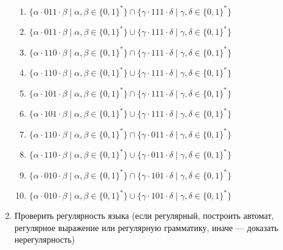 \documentclass[12pt]{article}
\begin{document}
\begin{enumerate}
\begin{enumerate}[label=\arabic*)]
    \item $\{ \alpha \cdot 011 \cdot \beta \mid \alpha, \beta \in \{0, 1\}^*\} \cap \{\gamma \cdot 111 \cdot \delta \mid \gamma, \delta \in \{0, 1\}^* \}$
    \item $\{ \alpha \cdot 011 \cdot \beta \mid \alpha, \beta \in \{0, 1\}^*\} \cup \{\gamma \cdot 111 \cdot \delta \mid \gamma, \delta \in \{0, 1\}^* \}$
    \item $\{ \alpha \cdot 110 \cdot \beta \mid \alpha, \beta \in \{0, 1\}^*\} \cap \{\gamma \cdot 111 \cdot \delta \mid \gamma, \delta \in \{0, 1\}^* \}$
    \item $\{ \alpha \cdot 110 \cdot \beta \mid \alpha, \beta \in \{0, 1\}^*\} \cup \{\gamma \cdot 111 \cdot \delta \mid \gamma, \delta \in \{0, 1\}^* \}$
    \item $\{ \alpha \cdot 101 \cdot \beta \mid \alpha, \beta \in \{0, 1\}^*\} \cap \{\gamma \cdot 111 \cdot \delta \mid \gamma, \delta \in \{0, 1\}^* \}$
    \item $\{ \alpha \cdot 101 \cdot \beta \mid \alpha, \beta \in \{0, 1\}^*\} \cup \{\gamma \cdot 111 \cdot \delta \mid \gamma, \delta \in \{0, 1\}^* \}$
    \item $\{ \alpha \cdot 110 \cdot \beta \mid \alpha, \beta \in \{0, 1\}^*\} \cap \{\gamma \cdot 011 \cdot \delta \mid \gamma, \delta \in \{0, 1\}^* \}$
    \item $\{ \alpha \cdot 110 \cdot \beta \mid \alpha, \beta \in \{0, 1\}^*\} \cup \{\gamma \cdot 011 \cdot \delta \mid \gamma, \delta \in \{0, 1\}^* \}$
    \item $\{ \alpha \cdot 010 \cdot \beta \mid \alpha, \beta \in \{0, 1\}^*\} \cap \{\gamma \cdot 101 \cdot \delta \mid \gamma, \delta \in \{0, 1\}^* \}$
    \item $\{ \alpha \cdot 010 \cdot \beta \mid \alpha, \beta \in \{0, 1\}^*\} \cup \{\gamma \cdot 101 \cdot \delta \mid \gamma, \delta \in \{0, 1\}^* \}$
  \end{enumerate}

  \item Проверить регулярность языка (если регулярный, построить автомат, регулярное выражение или регулярную грамматику, иначе --- доказать нерегулярность)
  \begin{enumerate}[label=\arabic*)]
    \setlength\itemsep{0.8em}


\end{enumerate}
\end{enumerate}
\end{document}
